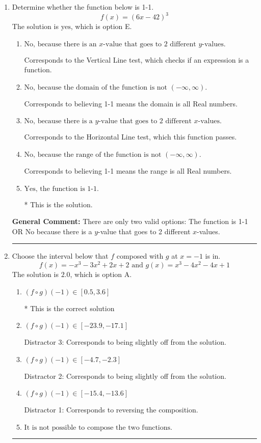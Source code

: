 \documentclass{extbook}[14pt]
\newcommand{\litem}[1]{\item #1

\rule{\textwidth}{0.4pt}}
\begin{document}
\begin{enumerate}\litem{
Determine whether the function below is 1-1.
\[ f(x) = (6 x - 42)^3 \]The solution is \( \text{yes} \), which is option E.\begin{enumerate}[label=\Alph*.]
\item \( \text{No, because there is an $x$-value that goes to 2 different $y$-values.} \)

Corresponds to the Vertical Line test, which checks if an expression is a function.
\item \( \text{No, because the domain of the function is not $(-\infty, \infty)$.} \)

Corresponds to believing 1-1 means the domain is all Real numbers.
\item \( \text{No, because there is a $y$-value that goes to 2 different $x$-values.} \)

Corresponds to the Horizontal Line test, which this function passes.
\item \( \text{No, because the range of the function is not $(-\infty, \infty)$.} \)

Corresponds to believing 1-1 means the range is all Real numbers.
\item \( \text{Yes, the function is 1-1.} \)

* This is the solution.
\end{enumerate}

\textbf{General Comment:} There are only two valid options: The function is 1-1 OR No because there is a $y$-value that goes to 2 different $x$-values.
}
\litem{
Choose the interval below that $f$ composed with $g$ at $x=-1$ is in.
\[ f(x) = -x^{3} -3 x^{2} +2 x + 2 \text{ and } g(x) = x^{3} -4 x^{2} -4 x + 1 \]The solution is \( 2.0 \), which is option A.\begin{enumerate}[label=\Alph*.]
\item \( (f \circ g)(-1) \in [0.5, 3.6] \)

* This is the correct solution
\item \( (f \circ g)(-1) \in [-23.9, -17.1] \)

 Distractor 3: Corresponds to being slightly off from the solution.
\item \( (f \circ g)(-1) \in [-4.7, -2.3] \)

 Distractor 2: Corresponds to being slightly off from the solution.
\item \( (f \circ g)(-1) \in [-15.4, -13.6] \)

 Distractor 1: Corresponds to reversing the composition.
\item \( \text{It is not possible to compose the two functions.} \)



\end{enumerate}}
\end{enumerate}
\end{document}
